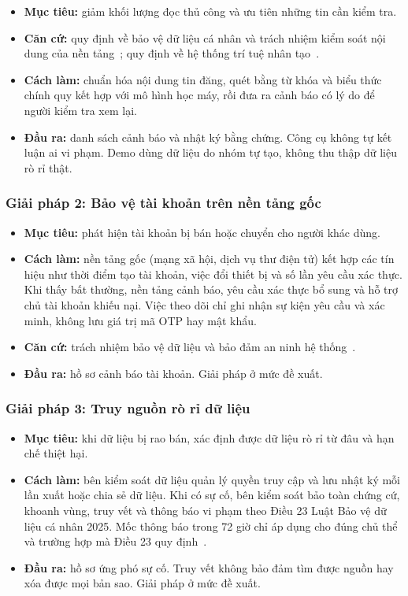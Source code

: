 \begin{itemize}
\item \textbf{Mục tiêu:} giảm khối lượng đọc thủ công và ưu tiên những tin cần kiểm tra.
\item \textbf{Căn cứ:} quy định về bảo vệ dữ liệu cá nhân và trách nhiệm kiểm soát nội dung của nền tảng~\cite{luat-bvdlcn-2025,vbhn-tmdt-2020,cuc-tmdt-2026}; quy định về hệ thống trí tuệ nhân tạo~\cite{luat-ai-2025}.
\item \textbf{Cách làm:} chuẩn hóa nội dung tin đăng, quét bằng từ khóa và biểu thức chính quy kết hợp với mô hình học máy, rồi đưa ra cảnh báo có lý do để người kiểm tra xem lại.
\item \textbf{Đầu ra:} danh sách cảnh báo và nhật ký bằng chứng. Công cụ không tự kết luận ai vi phạm. Demo dùng dữ liệu do nhóm tự tạo, không thu thập dữ liệu rò rỉ thật.
\end{itemize}
\subsubsection{Giải pháp 2: Bảo vệ tài khoản trên nền tảng gốc}\label{sec:5.1.2}

\begin{itemize}
\item \textbf{Mục tiêu:} phát hiện tài khoản bị bán hoặc chuyển cho người khác dùng.
\item \textbf{Cách làm:} nền tảng gốc (mạng xã hội, dịch vụ thư điện tử) kết hợp các tín hiệu như thời điểm tạo tài khoản, việc đổi thiết bị và số lần yêu cầu xác thực. Khi thấy bất thường, nền tảng cảnh báo, yêu cầu xác thực bổ sung và hỗ trợ chủ tài khoản khiếu nại. Việc theo dõi chỉ ghi nhận sự kiện yêu cầu và xác minh, không lưu giá trị mã OTP hay mật khẩu.
\item \textbf{Căn cứ:} trách nhiệm bảo vệ dữ liệu và bảo đảm an ninh hệ thống~\cite{luat-bvdlcn-2025,luat-anm-2025}.
\item \textbf{Đầu ra:} hồ sơ cảnh báo tài khoản. Giải pháp ở mức đề xuất.
\end{itemize}
\subsubsection{Giải pháp 3: Truy nguồn rò rỉ dữ liệu}\label{sec:5.1.3}

\begin{itemize}
\item \textbf{Mục tiêu:} khi dữ liệu bị rao bán, xác định được dữ liệu rò rỉ từ đâu và hạn chế thiệt hại.
\item \textbf{Cách làm:} bên kiểm soát dữ liệu quản lý quyền truy cập và lưu nhật ký mỗi lần xuất hoặc chia sẻ dữ liệu. Khi có sự cố, bên kiểm soát bảo toàn chứng cứ, khoanh vùng, truy vết và thông báo vi phạm theo Điều 23 Luật Bảo vệ dữ liệu cá nhân 2025. Mốc thông báo trong 72 giờ chỉ áp dụng cho đúng chủ thể và trường hợp mà Điều 23 quy định~\cite{luat-bvdlcn-2025,nd356-2025}.
\item \textbf{Đầu ra:} hồ sơ ứng phó sự cố. Truy vết không bảo đảm tìm được nguồn hay xóa được mọi bản sao. Giải pháp ở mức đề xuất.
\end{itemize}
